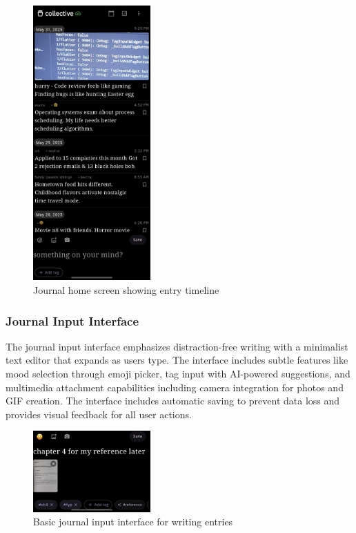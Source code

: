 \begin{samepage}
\begin{figure}[H]
\centering
\includegraphics[width=0.4\textwidth]{files/imgs/prototype/journal_screen.jpeg}
\caption{Journal home screen showing entry timeline}
\label{fig:journal-screen}
\end{figure}
\end{samepage}

\subsubsection{Journal Input Interface}

The journal input interface emphasizes distraction-free writing with a minimalist text editor that expands as users type. The interface includes subtle features like mood selection through emoji picker, tag input with AI-powered suggestions, and multimedia attachment capabilities including camera integration for photos and GIF creation. The interface includes automatic saving to prevent data loss and provides visual feedback for all user actions.

\begin{samepage}
\begin{figure}[H]
\centering
\includegraphics[width=0.4\textwidth]{files/imgs/prototype/journal_input_basic.jpeg}
\caption{Basic journal input interface for writing entries}
\label{fig:journal-input-basic}
\end{figure}
\end{samepage}

